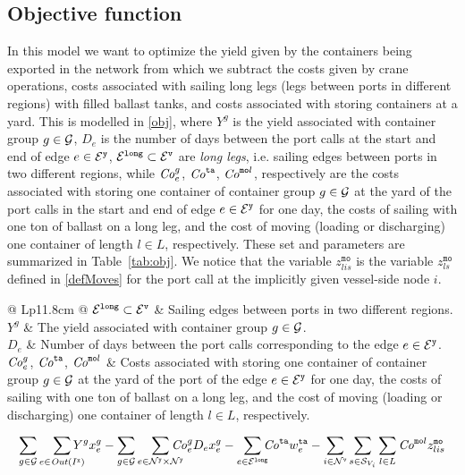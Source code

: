 \subsection{Objective function}
In this model we want to optimize the yield given by the containers being exported in the network from which we subtract the costs given by crane operations, costs associated with sailing long legs (legs between ports in different regions) with filled ballast tanks, and costs associated with storing containers at a yard. This is modelled in \eqref{obj}, where $Y^g$ is the yield associated with container group $g\in\mathcal{G}$, $D_e$ is the number of days between the port calls at the start and end of edge $e\in \mathcal{E}^\texttt{y}$, $\mathcal{E}^\texttt{long}\subset\mathcal{E}^\texttt{v}$ are \emph{long legs}, i.e. sailing edges between ports in two different regions, while $\mathit{Co}^g_{e}$, $\mathit{Co}^\texttt{ta}$, $\mathit{Co}^{\texttt{mo}l}$, respectively are the costs associated with storing one container of container group $g\in\mathcal{G}$ at the yard of the port calls in the start and end of edge $e\in\mathcal{E}^\texttt{y}$ for one day, the costs of sailing with one ton of ballast on a long leg, and the cost of moving (loading or discharging) one container of length $l\in L$, respectively. These set and parameters are summarized in Table~\ref{tab:obj}. {We notice that the variable $z^{\texttt{mo}}_{lis}$ is the variable $z^\texttt{mo}_{ls}$ defined in \eqref{defMoves} for the port call at the implicitly given vessel-side node $i$.}

\begin{table}[width=.9\linewidth,cols=2,pos=h]
\caption{set and parameters used in the objective function.}\label{tab:obj}
\begin{tabular*}{\tblwidth}{@{} Lp{11.8cm} @{}}
\toprule
$\mathcal{E}^\texttt{long}\subset\mathcal{E}^\texttt{v}$ & Sailing edges between ports in two different regions.\\
\midrule
$Y^g$ 		& The yield associated with container group $g\in\mathcal{G}$.\\
$D_e$ 		& Number of days between the port calls corresponding to the edge $e\in\mathcal{E}^\texttt{y}$.\\
$\mathit{Co}^g_e$, $\mathit{Co}^\texttt{ta}$, $\mathit{Co}^{\texttt{mo}l}$ 
			& Costs associated with storing one container of container group $g\in\mathcal{G}$ at the yard of the port of the edge $e\in\mathcal{E}^\texttt{y}$ for one day, the costs of sailing with one ton of ballast on a long leg, and the cost of moving (loading or discharging) one container of length $l\in L$, respectively.\\
\bottomrule
\end{tabular*}
\end{table}

\begin{equation}\label{obj}
\sum_{g\in\mc{G}}\so[r]{\sum_{e\in\mi{Out}(I^\ttt{x})}}Y^g x^g_{e} 
- \sum_{g\in\mc{G}}\so[r]{\sum_{e\in \mc{N}^\ttt{y}\times\mc{N}^\ttt{y}}} \mi{Co}^g_e D_e x^g_e 
- \so[r]{\sum_{e\in\mc{E}^\ttt{long}}} \mi{Co}^\ttt{ta} w^\ttt{ta}_e 
-\sum_{i\in \mc{N}^\ttt{v}}\sum_{s\in\mc{S}_{V_i}}\sum_{l\in L} \mi{Co}^{\ttt{mo}l} z^{\ttt{mo}}_{lis}
\end{equation}
